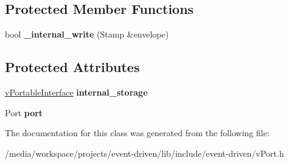 \subsection*{Protected Member Functions}
\begin{DoxyCompactItemize}
\item 
\mbox{\label{classev_1_1vWritePort_a05c3debed09851bd024782ca0e4a7b54}} 
bool {\bfseries \+\_\+internal\+\_\+write} (Stamp \&envelope)
\end{DoxyCompactItemize}
\subsection*{Protected Attributes}
\begin{DoxyCompactItemize}
\item 
\mbox{\label{classev_1_1vWritePort_af9ffcc74c80d4c04f2447c718c52f270}} 
\hyperlink{classev_1_1vPortableInterface}{v\+Portable\+Interface} {\bfseries internal\+\_\+storage}
\item 
\mbox{\label{classev_1_1vWritePort_a0cb1d83ab6473e736660b9e95a5e35b9}} 
Port {\bfseries port}
\end{DoxyCompactItemize}


The documentation for this class was generated from the following file\+:\begin{DoxyCompactItemize}
\item 
/media/workspace/projects/event-\/driven/lib/include/event-\/driven/v\+Port.\+h\end{DoxyCompactItemize}
